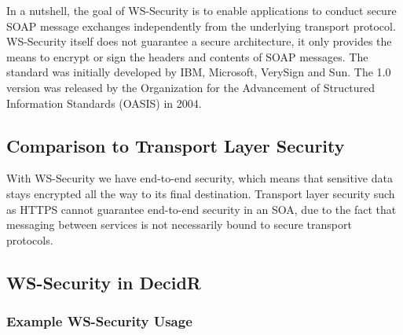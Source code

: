 In a nutshell, the goal of WS-Security is to enable applications to conduct
secure SOAP message exchanges\supercite{ws-sec} independently from the underlying transport
protocol. WS-Security itself does not guarantee a secure architecture, it only
provides the means to encrypt or sign the headers and contents of SOAP
messages. The standard was initially developed by IBM, Microsoft, VerySign and
Sun. The 1.0 version was released by the Organization for the Advancement
of Structured Information Standards (OASIS) in 2004. 

\subsection{Comparison to Transport Layer Security}
\label{sec:comparison-to-transport-layer-securtiy}

With WS-Security we have end-to-end security, which means that sensitive data
stays encrypted all the way to its final destination. Transport layer
security such as HTTPS cannot guarantee end-to-end security in an SOA, due to
the fact that messaging between services is not necessarily bound to secure
transport protocols.


\subsection{WS-Security in DecidR}
\label{subsec:ws-security-in-decidr}


\subsubsection{Example WS-Security Usage}
\label{subsec:example-ws-security-usage}
